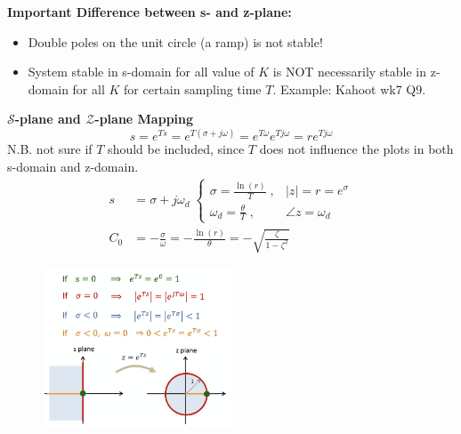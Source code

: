 \textbf{\large Important Difference between s- and z-plane:} 
\begin{itemize}
    \item Double poles on the unit circle (a ramp) is not stable!
    \item System stable in s-domain for all value of $K$ is NOT necessarily stable in z-domain for all $K$ for certain sampling time $T$. Example: Kahoot wk7 Q9.
\end{itemize}

\textbf{\large $\mathcal{S}$-plane and $\mathcal{Z}$-plane Mapping}
\begin{equation*}
    s= e^{Ts} = e^{T(\sigma + j \omega)} = e^{T\omega} e^{T j\omega} = r e^{T j\omega}
\end{equation*}
N.B. not sure if $T$ should be included, since $T$ does not influence the plots in both s-domain and z-domain.
\begin{align*}
    s &= \sigma + j \omega_d \; \begin{cases}
    \sigma = \frac{\ln(r)}{T}\; , & |z| = r = e^{\sigma} \\
    \omega_d = \frac{\theta}{T} \; , & \angle z = \omega_d 
    \end{cases} \\
    C_0 &= -\frac{\sigma}{\omega} = - \frac{\ln(r)}{\theta} = -\sqrt{\frac{\zeta}{1-\zeta^2}} 
\end{align*}
\begin{figure}[H]
    \centering
    \includegraphics[width=0.5\textwidth]{images/s_z_mapping.png}
\end{figure}

